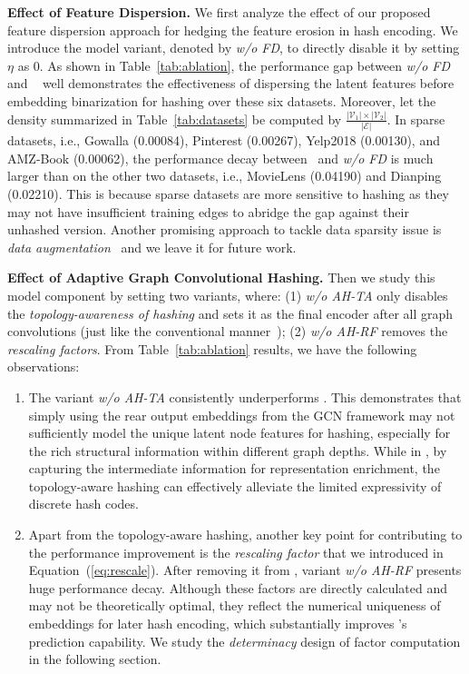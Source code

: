 {\textbf{Effect of Feature Dispersion.}}
We first analyze the effect of our proposed feature dispersion approach for hedging the feature erosion in hash encoding.
We introduce the model variant, denoted by \textsl{w/o FD}, to directly disable it by setting $\eta$ as 0.
As shown in Table~\ref{tab:ablation}, the performance gap between \textsl{w/o FD} and \model~ well demonstrates the effectiveness of dispersing the latent features before embedding binarization for hashing over these six datasets. 
Moreover, let the density summarized in Table~\ref{tab:datasets} be computed by $\frac{|\mathcal{V}_1|\times |\mathcal{V}_2|}{|\mathcal{E}|}$. 
In sparse datasets, i.e., Gowalla (0.00084), Pinterest (0.00267), Yelp2018 (0.00130), and AMZ-Book (0.00062), the performance decay between \model~and \textsl{w/o FD} is much larger than on the other two datasets, i.e., MovieLens (0.04190) and Dianping (0.02210).
This is because sparse datasets are more sensitive to hashing as they may not have insufficient training edges to abridge the gap against their unhashed version.
Another promising approach to tackle data sparsity issue is \textit{data augmentation}~\cite{zhang2022costa} and we leave it for future work.




{\textbf{Effect of Adaptive Graph Convolutional Hashing.}}
Then we study this model component by setting two variants, where: (1) \textsl{w/o AH-TA} only disables the \textit{topology-awareness of hashing} and sets it as the final encoder after all graph convolutions (just like the conventional manner~\cite{hashgnn,hashnet}); (2) \textsl{w/o AH-RF} removes the \textit{rescaling factors}.
From Table~\ref{tab:ablation} results, we have the following observations:
\begin{enumerate}[leftmargin=*]
\item 
The variant \textsl{w/o AH-TA} consistently underperforms \model.
This demonstrates that simply using the rear output embeddings from the GCN framework may not sufficiently model the unique latent node features for hashing, especially for the rich structural information within different graph depths.
While in \model, by capturing the intermediate information for representation enrichment, the topology-aware hashing can effectively alleviate the limited expressivity of discrete hash codes.


\item Apart from the topology-aware hashing, another key point for contributing to the performance improvement is the \textit{rescaling factor} that we introduced in Equation~(\ref{eq:rescale}).
After removing it from \model, variant \textsl{w/o AH-RF} presents huge performance decay.
Although these factors are directly calculated and may not be theoretically optimal, they reflect the numerical uniqueness of embeddings for later hash encoding, which substantially improves \model's prediction capability. 
We study the \textit{determinacy} design of factor computation in the following section.
\end{enumerate}






